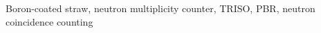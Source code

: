 \documentclass[preprint,final]{elsarticle}
\begin{document}
\begin{frontmatter}
\begin{abstract}
\end{abstract}

\begin{keyword}
{Boron-coated straw, neutron multiplicity counter, TRISO, PBR, neutron coincidence counting}
\end{keyword}

\end{frontmatter}
\end{document}
